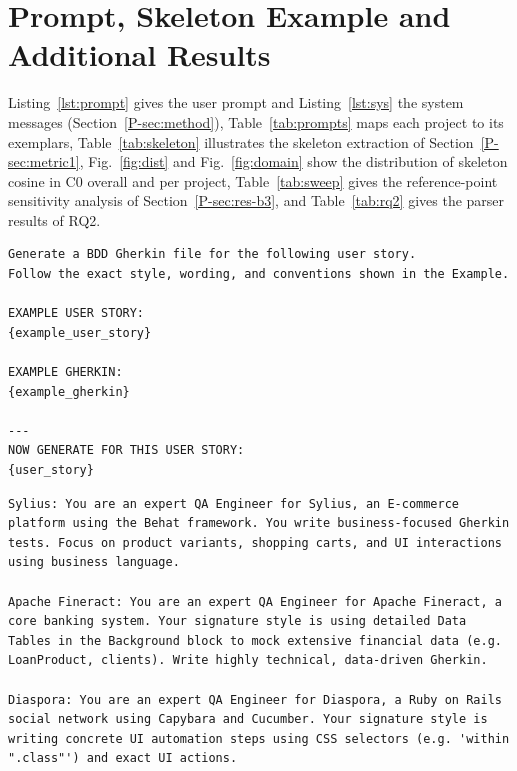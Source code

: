 \raggedbottom %

\section{Prompt, Skeleton Example and Additional Results}
\label{app:details}

Listing~\ref{lst:prompt} gives the user prompt and Listing~\ref{lst:sys} the system messages (Section~\ref{P-sec:method}), Table~\ref{tab:prompts} maps each project to its exemplars, Table~\ref{tab:skeleton} illustrates the skeleton extraction of Section~\ref{P-sec:metric1}, Fig.~\ref{fig:dist} and Fig.~\ref{fig:domain} show the distribution of skeleton cosine in C0 overall and per project, Table~\ref{tab:sweep} gives the reference-point sensitivity analysis of Section~\ref{P-sec:res-b3}, and Table~\ref{tab:rq2} gives the parser results of RQ2.

\noindent\begin{minipage}{\linewidth}
\begin{lstlisting}[caption={User prompt of conditions C0 and C2, verbatim except for the three braced placeholders; the first line ends with a space. C1 drops the second line and both example blocks.},label={lst:prompt}]
Generate a BDD Gherkin file for the following user story.
Follow the exact style, wording, and conventions shown in the Example.

EXAMPLE USER STORY:
{example_user_story}

EXAMPLE GHERKIN:
{example_gherkin}

---
NOW GENERATE FOR THIS USER STORY:
{user_story}
\end{lstlisting}
\end{minipage}

\noindent\begin{minipage}{\linewidth}
\begin{lstlisting}[caption={System messages, verbatim. Each project keeps its message in C0, C1 and C2.},label={lst:sys}]
Sylius: You are an expert QA Engineer for Sylius, an E-commerce platform using the Behat framework. You write business-focused Gherkin tests. Focus on product variants, shopping carts, and UI interactions using business language.

Apache Fineract: You are an expert QA Engineer for Apache Fineract, a core banking system. Your signature style is using detailed Data Tables in the Background block to mock extensive financial data (e.g. LoanProduct, clients). Write highly technical, data-driven Gherkin.

Diaspora: You are an expert QA Engineer for Diaspora, a Ruby on Rails social network using Capybara and Cucumber. Your signature style is writing concrete UI automation steps using CSS selectors (e.g. 'within ".class"') and exact UI actions.
\end{lstlisting}
\end{minipage}

